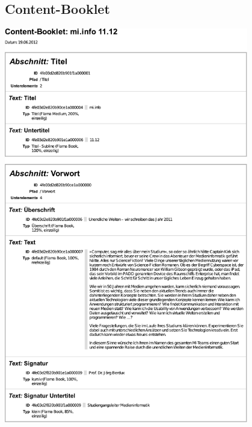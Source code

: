 \subsection{Content-Booklet}\label{l:booklet}

\begin{center}
\includegraphics[width=0.80\textwidth]{media/contentbooklet.pdf}
\end{center}